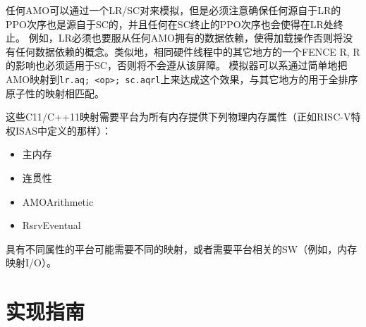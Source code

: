 任何AMO可以通过一个LR/SC对来模拟，但是必须注意确保任何源自于LR的PPO次序也是源自于SC的，并且任何在SC终止的PPO次序也会使得在LR处终止。
例如，LR必须也要服从任何AMO拥有的数据依赖，使得加载操作否则将没有任何数据依赖的概念。类似地，相同硬件线程中的其它地方的一个FENCE R, R的影响也必须适用于SC，否则将不会遵从该屏障。
模拟器可以系通过简单地把AMO映射到{\tt lr.aq;~<op>;~sc.aqrl}上来达成这个效果，与其它地方的用于全排序原子性的映射相匹配。

这些C11/C++11映射需要平台为所有内存提供下列物理内存属性（正如RISC-V特权ISAS中定义的那样）：
\begin{itemize}
  \item 主内存
  \item 连贯性
  \item AMOArithmetic
  \item RsrvEventual
\end{itemize}
具有不同属性的平台可能需要不同的映射，或者需要平台相关的SW（例如，内存映射I/O）。

\section{实现指南}

